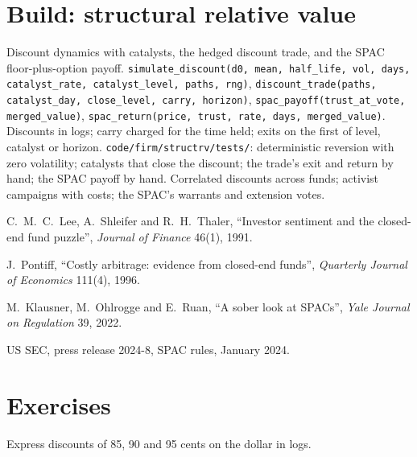 \section{Build: structural relative value}\label{bld:s1:share-classes-holding-companies-closed-end-funds-spacs:structrv}

\begin{build}
 Discount dynamics with catalysts, the hedged discount trade, and the SPAC floor-plus-option payoff.
 \texttt{simulate\_discount(d0, mean, half\_life, vol, days, catalyst\_rate, catalyst\_level, paths, rng)}, \texttt{discount\_trade(paths,
catalyst\_day, close\_level, carry, horizon)}, \texttt{spac\_payoff(trust\_at\_vote, merged\_value)}, \texttt{spac\_return(price, trust, rate, days,
merged\_value)}.
 Discounts in logs; carry charged for the time held; exits on the first of level, catalyst or horizon.
 \texttt{code/firm/structrv/tests/}: deterministic reversion with zero volatility; catalysts that close the discount; the trade's exit
and return by hand; the SPAC payoff by hand.
 Correlated discounts across funds; activist campaigns with costs; the SPAC's warrants and extension votes.
\end{build}

\begin{omsources}
\item C.~M.~C.~Lee, A.~Shleifer and R.~H.~Thaler, ``Investor sentiment and the closed-end fund puzzle'', \emph{Journal of Finance} 46(1), 1991.
\item J.~Pontiff, ``Costly arbitrage: evidence from closed-end funds'', \emph{Quarterly Journal of Economics} 111(4), 1996.
\item M.~Klausner, M.~Ohlrogge and E.~Ruan, ``A sober look at SPACs'', \emph{Yale Journal on Regulation} 39, 2022.
\item US SEC, press release 2024-8, SPAC rules, January 2024.
\end{omsources}

\section{Exercises}

\begin{exercise}[$\star$]\label{exo:s1:share-classes-holding-companies-closed-end-funds-spacs:1}
Express discounts of 85, 90 and 95 cents on the dollar in logs.
\end{exercise}

